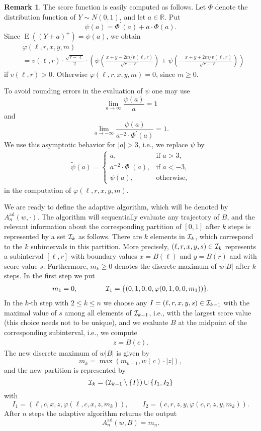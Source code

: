 \documentclass[a4paper]{amsart}
\theoremstyle{definition}
\newtheorem{rem}[exmp]{Remark}
\theoremstyle{plain}
\newcommand{\R}{\mathbb R}
\newcommand{\E}{\operatorname{E}}
\newcommand{\I}{\ensuremath \mathcal I}
\newcommand{\adap}{\ensuremath{ \mathrm{ad} }}
\begin{document}
\begin{rem}\label{r5}
The score function is easily computed as follows.
Let $\Phi$ denote the distribution function of $Y\sim N(0,1)$, and
let $a \in \R$. Put
\[
\psi (a) = \Phi^\prime(a) + a \cdot \Phi(a).
\]
Since $\E \left( (Y+a)^+ \right) = \psi(a)$, we obtain
\begin{align*}
&\varphi(\ell,r,x,y, m)\\
&=
v(\ell,r) \cdot \frac{\sqrt{r-\ell}}{2}
\cdot \left(
\psi\left(\frac{x+y-2m/v(\ell,r)}{\sqrt{r-\ell}}\right)
+
\psi\left(-\frac{x+y+2m/v(\ell,r)}{\sqrt{r-\ell}}\right)
\right)
\end{align*}
if $v(\ell,r)>0$. Otherwise
$\varphi(\ell,r,x,y,m) = 0$, since $m \geq 0$.

To avoid rounding errors in the evaluation of $\psi$ one may use
\[
\lim_{a\to\infty} \frac{\psi(a)}{a}=1
\]
and
\[
\lim_{a \to -\infty}
\frac{\psi(a)}{a^{-2} \cdot \Phi^\prime(a)} = 1.
\]
We use this asymptotic behavior for $|a|>3$, i.e., we replace $\psi$ by
\begin{align*}
\widetilde{\psi}(a)
=
\begin{cases}
a,  & \text{if $a> 3$},\\
a^{-2} \cdot \Phi^\prime(a), & \text{if $a<-3$},\\
\psi(a), & \text{otherwise},
\end{cases}
\end{align*}
in the computation of $\varphi(\ell,r,x,y, m)$.
\end{rem}

We are ready to define the adaptive algorithm, which will be
denoted by $A^\adap_n(w,\cdot)$.  The algorithm will sequentially
evaluate any trajectory of $B$,
and the relevant information about the corresponding partition of $[0,1]$
after $k$ steps is represented by a set $\I_k$ as follows.
There are $k$ elements in $\I_k$, which correspond
to the $k$ subintervals in this partition. More precisely,
$(\ell,r,x,y,s) \in \I_k$ represents a subinterval $[\ell,r]$ with
boundary values $x=B(\ell)$ and $y=B(r)$ and with score value $s$.
Furthermore, $m_k \geq 0$ denotes the discrete maximum of $w |B|$ after $k$
steps.
In the first step we put
\begin{align*}
m_1=0, \qquad \qquad
\I_1=\{(0,1,0,0,\varphi(0,1,0,0,m_1))\}.
\end{align*}
In the $k$-th step with $2 \leq k \leq n$ we
choose any $I = (\ell,r,x,y,s)\in \I_{k-1}$ with the maximal value of $s$
among all elements of $\I_{k-1}$,
i.e., with the largest score value (this choice needs not to be unique),
and we evaluate $B$ at the midpoint of the corresponding
subinterval, i.e., we compute
\begin{align*}
z=B(c).
\end{align*}
The new discrete maximum of $w |B|$ is given by
\[
m_{k} = \max\left(m_{k-1}, w(c)\cdot |z|\right),
\]
and the new partition is represented by
\[
\I_{k} =\left(\I_{k-1}\setminus\{I\}\right)\cup \{I_1,I_2\}
\]
with
\[
I_1 = (\ell,c,x,z, \varphi(\ell,c,x,z, m_{k})), \qquad
I_2 = (c,r,z,y,\varphi(c,r,z,y, m_{k})).
\]
After $n$ steps the adaptive algorithm returns the output
\[
A^\adap_n(w,B)=m_n.
\]
\end{document}
